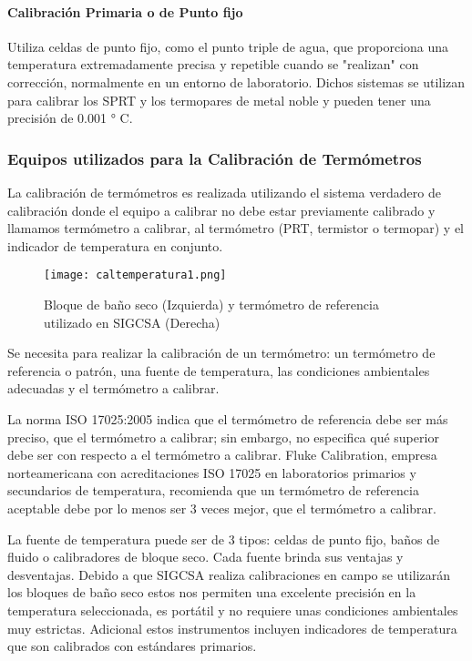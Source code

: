 \paragraph{Calibración Primaria o de Punto fijo} 
Utiliza celdas de punto fijo, como el punto triple de agua, que proporciona una temperatura extremadamente precisa y repetible cuando se "realizan" con corrección, normalmente en un entorno de laboratorio. Dichos sistemas se utilizan para calibrar los SPRT y los termopares de metal noble y pueden tener una precisión de 0.001 ° C.

\subsubsection{Equipos utilizados para la Calibración de Termómetros}

\par 
La calibración de termómetros es realizada utilizando el sistema verdadero de calibración donde el equipo a calibrar no debe estar previamente calibrado y llamamos termómetro a calibrar, al termómetro (PRT, termistor o termopar) y el indicador de temperatura en conjunto.

\begin{figure}[H]
	\centering
	\texttt{[image: caltemperatura1.png]}
	\caption{Bloque de baño seco (Izquierda) y termómetro de referencia utilizado en SIGCSA (Derecha)}
\end{figure}

\par \noindent
Se necesita para realizar la calibración de un termómetro: un termómetro de referencia o patrón, una fuente de temperatura, las condiciones ambientales adecuadas y el termómetro a calibrar.

\par \noindent
La norma ISO 17025:2005 indica que el termómetro de referencia debe ser más preciso, que el termómetro a calibrar; sin embargo, no especifica qué superior debe ser con respecto a el termómetro a calibrar. Fluke Calibration, empresa norteamericana con acreditaciones ISO 17025 en laboratorios primarios y secundarios de temperatura, recomienda que un termómetro de referencia aceptable debe por lo menos ser 3 veces mejor, que el termómetro a calibrar.



\par \noindent
La fuente de temperatura puede ser de 3 tipos: celdas de punto fijo, baños de fluido o calibradores de bloque seco.
Cada fuente brinda sus ventajas y desventajas. Debido a que SIGCSA realiza calibraciones en campo se utilizarán los bloques de baño seco estos nos permiten una excelente precisión en la temperatura seleccionada, es portátil y no requiere unas condiciones ambientales muy estrictas.
Adicional estos instrumentos incluyen indicadores de temperatura que son calibrados con estándares primarios.

